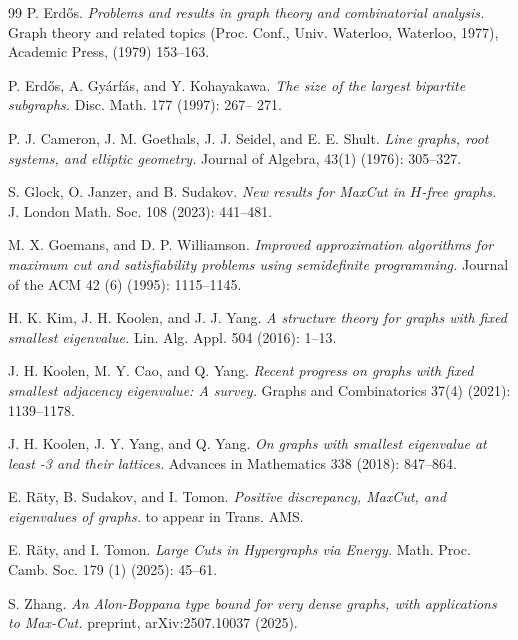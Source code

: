 \documentclass[11pt]{article}
\theoremstyle{plain}
\theoremstyle{definition}
\begin{document}
\begin{thebibliography}{99}
P. Erd\H{o}s.
\emph{Problems and results in graph theory and combinatorial analysis.}
Graph theory and related topics (Proc. Conf., Univ. Waterloo, Waterloo, 1977), Academic Press, (1979) 153--163.

P. Erd\H{o}s, A. Gy\'arf\'as, and Y. Kohayakawa.
\emph{The size of the largest bipartite subgraphs.}
Disc. Math. 177 (1997): 267-- 271.

P. J. Cameron, J. M. Goethals, J. J. Seidel, and E. E. Shult.
\emph{Line graphs, root systems, and elliptic geometry.}
Journal of Algebra, 43(1) (1976): 305--327.

S. Glock, O. Janzer, and B. Sudakov. 
\emph{New results for MaxCut in $H$-free graphs.}
J. London Math. Soc. 108 (2023): 441--481.

M. X. Goemans, and D. P. Williamson.
\emph{Improved approximation algorithms for maximum cut and satisfiability problems using semidefinite programming.} Journal of the ACM 42 (6) (1995): 1115--1145.

H. K. Kim, J. H. Koolen, and J. J. Yang.
\emph{A structure theory for graphs with fixed smallest eigenvalue.}
Lin. Alg. Appl. 504 (2016): 1--13.

J. H. Koolen, M. Y. Cao, and Q. Yang.
\emph{Recent progress on graphs with fixed smallest adjacency eigenvalue: A survey.}
Graphs and Combinatorics 37(4) (2021): 1139--1178.

J. H. Koolen, J. Y. Yang, and Q. Yang.
\emph{On graphs with smallest eigenvalue at least -3 and their lattices.}
Advances in Mathematics 338 (2018): 847--864.

E. R\"aty, B. Sudakov, and I. Tomon.
\emph{Positive discrepancy, MaxCut, and eigenvalues of graphs.}
to appear in Trans. AMS.

E. R\"aty, and I. Tomon.
\emph{Large Cuts in Hypergraphs via Energy.}
Math. Proc. Camb. Soc. 179 (1) (2025): 45--61.

S. Zhang.
\emph{An Alon-Boppana type bound for very dense graphs, with applications to Max-Cut.}
preprint, arXiv:2507.10037 (2025).

\end{thebibliography}
\end{document}
